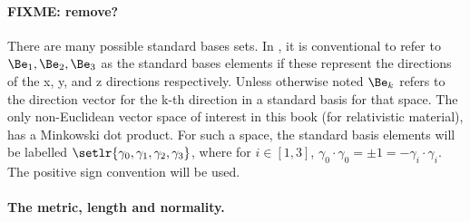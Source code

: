 
\paragraph{FIXME: remove?}
There are many possible standard bases sets.  In , it is conventional to refer to \( \Be_1, \Be_2, \Be_3 \) as the standard bases elements if these represent the directions of the x, y, and z directions respectively.  Unless otherwise noted \( \Be_k \) refers to the direction vector for the k-th direction in a standard basis for that space.
The only non-Euclidean vector space of interest in this book (for relativistic material), has a Minkowski dot product.  For such a space, the standard basis elements will be labelled \( \setlr{ \gamma_0, \gamma_1, \gamma_2, \gamma_3 } \), where for \( i \in [1,3] \), \( \gamma_0 \cdot \gamma_0 = \pm 1 = -\gamma_i \cdot \gamma_i \).  The positive sign convention will be used.

%

\paragraph{The metric, length and normality.}

